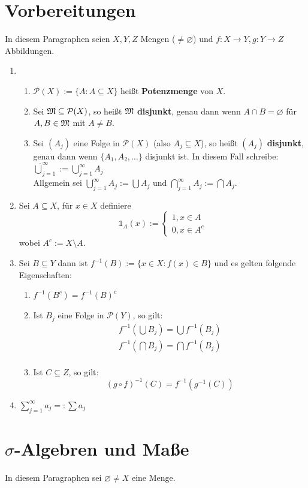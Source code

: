 \documentclass[a4paper,twoside,DIV15,BCOR12mm,chapterprefix=true,headings=onelinechapter]{scrbook}
\begin{document}
\chapter{Vorbereitungen}
In diesem Paragraphen seien $X,Y,Z$ Mengen ($\ne\varnothing$) und $f:X\to Y, g:Y\to Z$ Abbildungen.
\begin{enumerate}
\item 
\begin{enumerate}
\item $\mathcal{P}(X):=\{A:A\subseteq X\}$ heißt \textbf{Potenzmenge} von $X$.
\item Sei $\mathfrak{M}\subseteq\mathcal{P}(X)$, so heißt $\mathfrak{M}$ \textbf{disjunkt}, genau dann wenn $A\cap B=\varnothing$ für $A,B\in\mathfrak{M}$ mit $A\ne B$.
\item Sei $(A_j)$ eine Folge in $\mathcal{P}(X)$ (also $A_j\subseteq X$), so heißt $(A_j)$ \textbf{disjunkt}, genau dann wenn $\{A_1,A_2,\ldots\}$ disjunkt ist. In diesem Fall schreibe: $\dot{\bigcup}_{j=1}^\infty:=\bigcup_{j=1}^\infty A_j$\\
Allgemein sei $\bigcup_{j=1}^\infty A_j:=\bigcup A_j$ und $\bigcap_{j=1}^\infty A_j:=\bigcap A_j$.
\end{enumerate}
\item Sei $A\subseteq X$, für $x\in X$ definiere
\[\mathds{1}_A(x):=\begin{cases}1, x\in A\\ 0, x\in A^c\end{cases}\]
wobei $A^c:=X\setminus A$.
\item Sei $B\subseteq Y$ dann ist $f^{-1}(B):=\{x\in X: f(x)\in B\}$ und es gelten folgende Eigenschaften:
\begin{enumerate}
\item $f^{-1}(B^c)=f^{-1}(B)^c$
\item Ist $B_j$ eine Folge in $\mathcal{P}(Y)$, so gilt:
\begin{align*}
f^{-1}(\bigcup B_j)=\bigcup f^{-1}(B_j)\\
f^{-1}(\bigcap B_j)=\bigcap f^{-1}(B_j)\\
\end{align*}
\item Ist $C\subseteq Z$, so gilt:
\[(g\circ f)^{-1}(C)=f^{-1}(g^{-1}(C))\]
\end{enumerate}
\item $\sum_{j=1}^\infty a_j =: \sum a_j$
\end{enumerate}

\chapter{$\sigma$-Algebren und Maße}
In diesem Paragraphen sei $\varnothing\ne X$ eine Menge.
\end{document}
